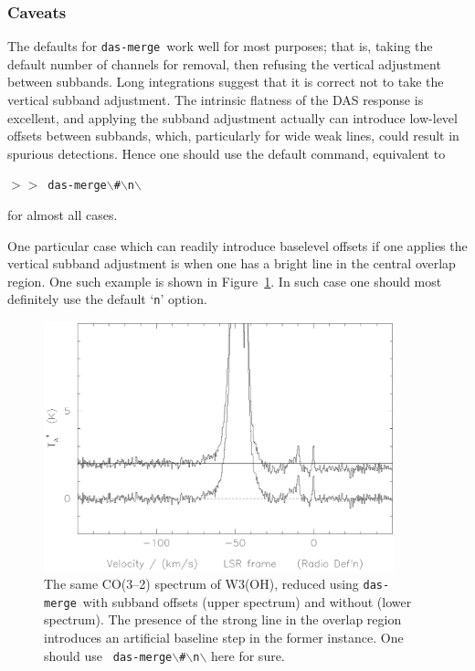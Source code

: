 \documentclass[11pt,twoside]{article}
\newcommand{\dm}{{\tt das-merge}}
\newcommand{\SP}{{$>\!>$}}
\begin{document}
\subsubsection{Caveats}
The defaults for \dm\ work well for most purposes; that is, taking the
default number of channels for removal, then refusing the vertical
adjustment between subbands. Long integrations suggest that it
is correct not to take the vertical subband adjustment.  The intrinsic
flatness of the DAS response is excellent, and applying the subband
adjustment actually can introduce low-level offsets between subbands,
which, particularly for wide weak lines, could result in spurious
detections.  Hence one should use the default command, equivalent to

\SP\ {\tt das-merge$\backslash$\#$\backslash$n$\backslash$} 

for almost all cases. 

One particular case which can readily introduce baselevel offsets if one
applies the vertical subband adjustment is when one has a bright line
in the central overlap region. One such example is shown in
Figure~\ref{fig:dasmerge_yn}. In such case one should most definitely
use the default `{\tt{n}}' option.
%
\begin{figure}[ht]
\centering
\includegraphics[width=4.0in]{sc8_dasmerge_yn.ps}
\vspace*{-0.5cm}
\begin{center}
\begin{minipage}[t]{5in}
\caption[\dm ; yes or no]
{\small{The same CO(3--2) spectrum of W3(OH), reduced using \dm\ with
subband offsets (upper spectrum) and without (lower spectrum). The
presence of the strong line in the overlap region introduces an
artificial baseline step in the former instance. One should use {\tt
das-merge$\backslash$\#$\backslash$n$\backslash$} here for sure.  }}
\label{fig:dasmerge_yn}
\end{minipage}
\end{center}
\end{figure}
\end{document}

